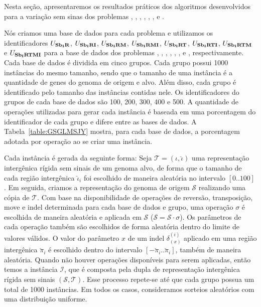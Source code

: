 Nesta seção, apresentaremos os resultados práticos dos algoritmos desenvolvidos para a variação sem sinas dos problemas \SbIR{}, \SbIRI{}, \SbIRM{}, \SbIRMI{}, \SbIRT{}, \SbIRTI{}, \SbIRTM{} e \SbIRTMI{}.

Nós criamos uma base de dados para cada problema e utilizamos os identificadores $U_{\textbf{Sb\textsubscript{I}R}}{}$, $U_{\textbf{Sb\textsubscript{I}RI}}{}$, $U_{\textbf{Sb\textsubscript{I}RM}}{}$, $U_{\textbf{Sb\textsubscript{I}RMI}}{}$, $U_{\textbf{Sb\textsubscript{I}RT}}{}$, $U_{\textbf{Sb\textsubscript{I}RTI}}{}$, $U_{\textbf{Sb\textsubscript{I}RTM}}{}$ e $U_{\textbf{Sb\textsubscript{I}RTMI}}{}$ para a base de dados dos problemas \SbIR{}, \SbIRI{}, \SbIRM{}, \SbIRMI{}, \SbIRT{}, \SbIRTI{}, \SbIRTM{} e \SbIRTMI{}, respectivamente. Cada base de dados é dividida em cinco grupos. Cada grupo possui 1000 instâncias do mesmo tamanho, sendo que o tamanho de uma instância é a quantidade de genes do genoma de origem e alvo. Além disso, cada grupo é identificado pelo tamanho das instâncias contidas nele. Os identificadores do grupos de cada base de dados são 100, 200, 300, 400 e 500. A quantidade de operações utilizadas para gerar cada instância é baseada em uma porcentagem do identificador de cada grupo e difere entre as bases de dados. A Tabela~\ref{table:GSGLMSJY} mostra, para cada base de dados, a porcentagem adotada por operação ao se criar uma instância. 



Cada instância é gerada da seguinte forma: Seja $\mathcal{T} = (\iota,\breve\iota)$ uma representação intergênica rígida sem sinais de um genoma alvo, de forma que o tamanho de cada região intergênica $\breve\iota_i$ foi escolhido de maneira aleatória no intervalo $[0..100]$. Em seguida, criamos a representação do genoma de origem $\mathcal{S}$ realizando uma cópia de $\mathcal{T}$. Com base na disponibilidade de operações de reversão, transposição, move e indel determinada para cada base de dados e grupo, uma operação $\sigma$ é escolhida de maneira aleatória e aplicada em $\mathcal{S}$ ($\mathcal{S} = \mathcal{S} \cdot \sigma$). Os parâmetros de cada operação também são escolhidos de forma aleatória dentro do limite de valores válidos. O valor do parâmetro $x$ de um indel $\delta^{(i)}_{(x)}$ aplicado em uma região intergênica $\breve\pi_{i}$ é escolhido dentro do intervalo $[-\breve\pi_{i}..\breve\pi_{i}]$, também de maneira aleatória. Quando não houver operações disponíveis para serem aplicadas, então temos a instância $\mathcal{I}$, que é composta pela dupla de representação intergênica rígida sem sinais $(\mathcal{S},\mathcal{T})$. Esse processo repete-se até que cada grupo possua um total de 1000 instâncias. Em todos os casos, consideramos sorteios aleatórios com uma distribuição uniforme.

